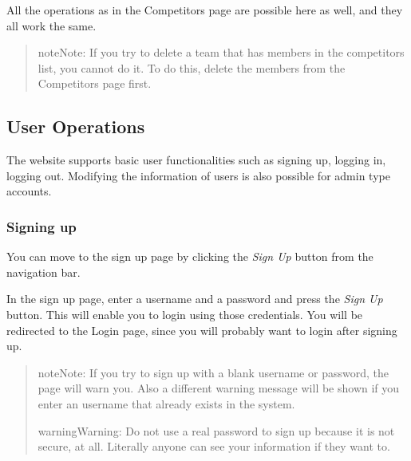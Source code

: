\documentclass[a4paper,10pt,english]{sphinxmanual}
\begin{document}
All the operations as in the Competitors page are possible here as well, and they all work the same.
\begin{quote}

\begin{notice}{note}{Note:}
If you try to delete a team that has members in the competitors list, you cannot do it. To do this, delete the members from the Competitors page first.
\end{notice}
\end{quote}


\subsection{User Operations}
\label{user/member4:user-operations}
The website supports basic user functionalities such as signing up, logging in, logging out. Modifying the information of users is also possible for admin type accounts.


\subsubsection{Signing up}
\label{user/member4:signing-up}
You can move to the sign up page by clicking the \emph{Sign Up} button from the navigation bar.
\begin{quote}

\end{quote}

In the sign up page, enter a username and a password and press the \emph{Sign Up} button. This will enable you to login using those credentials. You will be redirected to the Login page, since you will probably want to login after signing up.
\begin{quote}


\begin{notice}{note}{Note:}
If you try to sign up with a blank username or password, the page will warn you. Also a different warning message will be shown if you enter an username that already exists in the system.
\end{notice}

\begin{notice}{warning}{Warning:}
Do not use a real password to sign up because it is not secure, at all. Literally anyone can see your information if they want to.
\end{notice}
\end{quote}
\end{document}
